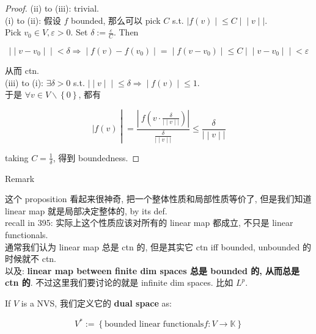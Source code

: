 \begin{proof}

(ii) to (iii): trivial.\\
(i) to (ii): 假设 \(f\) bounded, 那么可以 pick \(C\) s.t. \(\left. |f(v) \middle| \leq C \middle| \middle| v \middle| | \right.\).\\
Pick \(v_{0} \in V,\varepsilon > 0\). Set \(\delta := \frac{\varepsilon}{C}\). Then

\[\left. | \middle| v - v_{0} \middle| \middle| < \delta\Longrightarrow \middle| f(v) - f(v_{0}) \middle| = \middle| f(v - v_{0}) \middle| \leq C \middle| \middle| v - v_{0} \middle| \middle| < \varepsilon \right.\]

从而 ctn.\\
(iii) to (i): \(\exists\delta > 0\) s.t. \(\left. | \middle| v \middle| \middle| \leq \delta\Longrightarrow \middle| f(v) \middle| \leq 1 \right.\).\\
于是 \(\forall v \in V\backslash\left\{ 0 \right\}\), 都有

\[\left. |f(v) \middle| = \frac{|\ f(v \cdot \frac{\delta}{\left. | \middle| v \middle| | \right.})|}{\frac{\delta}{\left. | \middle| v \middle| | \right.}} \leq \frac{\delta}{\left. | \middle| v \middle| | \right.} \right.\]

taking \(C = \frac{1}{\delta}\), 得到 boundedness.

\end{proof}

\begin{qlremark}{Remark}

这个 proposition 看起来很神奇, 把一个整体性质和局部性质等价了, 但是我们知道 linear map 就是局部决定整体的, by its def.\\
recall in 395: 实际上这个性质应该对所有的 linear map 都成立, 不只是 linear functionals.\\
通常我们认为 linear map 总是 ctn 的, 但是其实它 ctn iff bounded, unbounded 的时候就不 ctn.\\
以及: \textbf{linear map between finite dim spaces 总是 bounded 的, 从而总是 ctn 的}. 不过这里我们要讨论的就是 infinite dim spaces. 比如 \(L^{p}\).

\end{qlremark}

\begin{definition}{}

If \(V\) is a NVS, 我们定义它的 \textbf{dual space} as:

\[V^{\ast} := \left\{ {\text{bounded linear functionals} f:V\rightarrow\mathbb{K}} \right\}\]

\end{definition}

